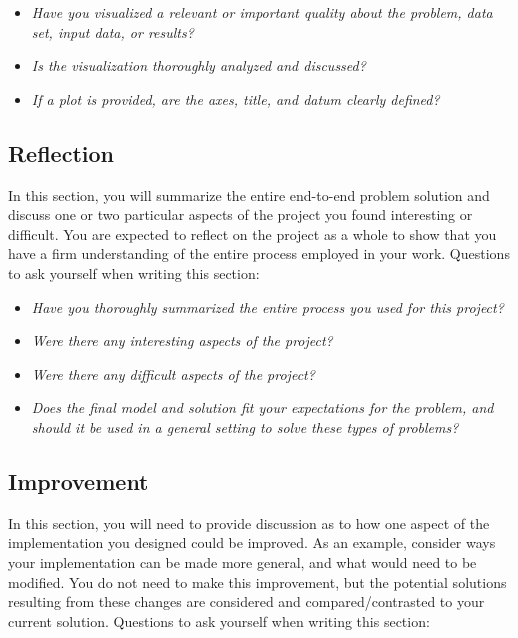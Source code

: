 \documentclass{article}
\begin{document}
\begin{itemize}
\item
  \emph{Have you visualized a relevant or important quality about the
  problem, data set, input data, or results?}
\item
  \emph{Is the visualization thoroughly analyzed and discussed?}
\item
  \emph{If a plot is provided, are the axes, title, and datum clearly
  defined?}
\end{itemize}

\subsection{Reflection}\label{reflection}

In this section, you will summarize the entire end-to-end problem
solution and discuss one or two particular aspects of the project you
found interesting or difficult. You are expected to reflect on the
project as a whole to show that you have a firm understanding of the
entire process employed in your work. Questions to ask yourself when
writing this section:

\begin{itemize}
\item
  \emph{Have you thoroughly summarized the entire process you used for
  this project?}
\item
  \emph{Were there any interesting aspects of the project?}
\item
  \emph{Were there any difficult aspects of the project?}
\item
  \emph{Does the final model and solution fit your expectations for the
  problem, and should it be used in a general setting to solve these
  types of problems?}
\end{itemize}

\subsection{Improvement}\label{improvement}

In this section, you will need to provide discussion as to how one
aspect of the implementation you designed could be improved. As an
example, consider ways your implementation can be made more general, and
what would need to be modified. You do not need to make this
improvement, but the potential solutions resulting from these changes
are considered and compared/contrasted to your current solution.
Questions to ask yourself when writing this section:
\end{document}
